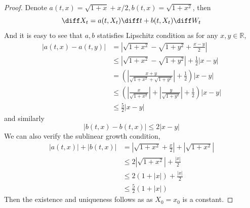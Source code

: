     \problem
    \begin{subproblem}
        \item
        \begin{proof}
            Denote $a(t,x)=\sqrt{1+x}+x/2,b(t,x)=\sqrt{1+x^2}$, then
            \[\diff X_t=a(t,X_t)\diff t+b(t,X_t)\diff W_t\]
            And it is easy to see that $a,b$ statisfies Lipschitz condition as
            for any $x,y\in\mathbb R$,
            \[\begin{aligned}
                |a(t,x)-a(t,y)|
                &=\left|\sqrt{1+x^2}-\sqrt{1+y^2}+\frac{x-y}{2}\right|\\
                &\leq\left|\sqrt{1+x^2}-\sqrt{1+y^2}\right|+\frac{1}{2}|x-y|\\
                &=\left(\left|\frac{x+y}{\sqrt{1+x^2}+\sqrt{1+y^2}}\right|+\frac{1}{2}\right)|x-y|\\
                &\leq\left(\left|\frac{x}{\sqrt{1+x^2}}\right|
                +\left|\frac{y}{\sqrt{1+y^2}}\right|+\frac{1}{2}\right)|x-y|\\
                &\leq\frac{5}{2}|x-y|
            \end{aligned}\]
            and similarly
            \[|b(t,x)-b(t,x)|\leq 2|x-y|\]
            We can also verify the sublinear growth condition,
            \[\begin{aligned}
                |a(t,x)|+|b(t,x)|&=\left|\sqrt{1+x^2}+\frac{x}{2}\right|
                +\left|\sqrt{1+x^2}\right|\\
                &\leq 2\left|\sqrt{1+x^2}\right|+\frac{|x|}{2}\\
                &\leq 2(1+|x|)+\frac{|x|}{2}\\
                &\leq \frac{5}{2}(1+|x|)
            \end{aligned}\]
            Then the existence and uniqueness follows as
            as $X_0=x_0$ is a constant.
        \end{proof}


\end{subproblem}
